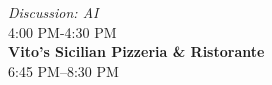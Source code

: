 \begin{calendar}{\textwidth}
{\textit{Discussion: AI}  \\\vspace{0.1cm}4:00 PM-4:30 PM \\\daysep
\textbf{Vito's Sicilian Pizzeria \& Ristorante} \\\vspace{0.1cm} 6:45 PM--8:30 PM \\\daysep
}




\end{calendar}
